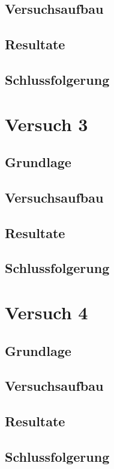 \documentclass{article}
\begin{document}
\subsection{Versuchsaufbau}
\subsection{Resultate}
\subsection{Schlussfolgerung}
\section{Versuch 3}
\subsection{Grundlage}
\subsection{Versuchsaufbau}
\subsection{Resultate}
\subsection{Schlussfolgerung}
\section{Versuch 4}
\subsection{Grundlage}
\subsection{Versuchsaufbau}
\subsection{Resultate}
\subsection{Schlussfolgerung}
\end{document}
